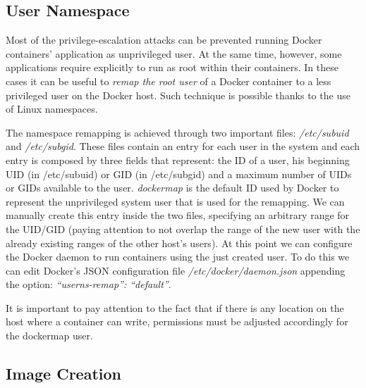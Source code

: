 \documentclass[a4paper,12pt]{article}
\begin{document}
\subsection{User Namespace}

Most of the privilege-escalation attacks can be prevented running Docker
containers' application as unprivileged user. At the same time, however, some
applications require explicitly to run as root within their containers. In these
cases it can be useful to \textit{remap the root user} \cite{isolate_namespace}
of a Docker container to a less privileged user on the Docker host. Such
technique is possible thanks to the use of Linux namespaces. \par The namespace
remapping is achieved through two important files: \textit{/etc/subuid} and
\textit{/etc/subgid}. These files contain an entry for each user in the system
and each entry is composed by three fields that represent: the ID of a user, his
beginning UID (in /etc/subuid) or GID (in /etc/subgid) and a maximum number of
UIDs or GIDs available to the user. \textit{dockermap} is the default ID used by
Docker to represent the unprivileged system user that is used for the remapping.
We can manually create this entry inside the two files, specifying an arbitrary
range for the UID/GID (paying attention to not overlap the range of the new user
with the already existing ranges of the other host's users). At this point we
can configure the Docker daemon to run containers using the just created user.
To do this we can edit Docker's JSON configuration file
\textit{/etc/docker/daemon.json} appending the option: \textit{``userns-remap'':
``default''}. \par It is important to pay attention to the fact that if there is any
location on the host where a container can write, permissions must be
adjusted accordingly for the dockermap user. 

\subsection{Image Creation}
\end{document}
